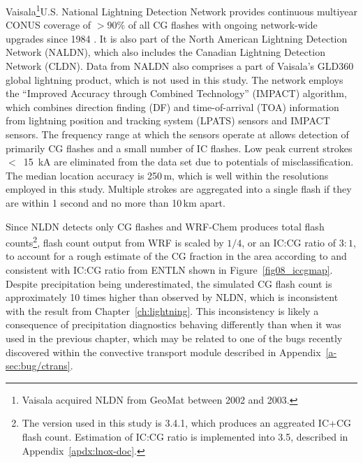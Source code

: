 
Vaisala\footnote{Vaisala acquired NLDN from GeoMat between 2002 and 2003.}U.S. National Lightning Detection Network
\citep[NLDN;][]{Cummins:2009aa} provides continuous multiyear CONUS coverage of $>90\%$ of all CG flashes with ongoing
network-wide upgrades since 1984 \citep{Orville:2002uq,Orville:2010uq}. It is also part of the North American Lightning
Detection Network (NALDN), which also includes the Canadian Lightning Detection Network (CLDN). Data from NALDN
also comprises a part of Vaisala's GLD360 global lightning product, which is not used in this study. The network employs
the ``Improved Accuracy through Combined Technology'' (IMPACT) algorithm, which combines direction finding (DF)
and time-of-arrival (TOA) information from lightning position and tracking system (LPATS) sensors and IMPACT sensors.
The frequency range at which the sensors operate at allows detection of primarily CG flashes and a small number of IC
flashes. Low peak current strokes $<$~15~\unit{kA} are eliminated from the data set due to potentials of misclassification. The
median location accuracy is 250\,\unit{m}, which is well within the resolutions employed in this study. Multiple strokes are
aggregated into a single flash if they are within 1 second and no more than 10\,\unit{km} apart.

Since NLDN detects only CG flashes and WRF-Chem produces total flash counts\footnote{The version used in this study is 3.4.1,
which produces an aggreated IC+CG flash count. Estimation of IC:CG ratio is implemented into 3.5, described in
Appendix~\ref{apdx:lnox-doc}.}, flash count output from WRF is scaled by $1/4$, or an IC:CG ratio of $3:1$, to account
for a rough estimate of the CG fraction in the area according to \citet{Boccippio:2001ys} and consistent with IC:CG ratio from ENTLN
shown in Figure~\ref{fig08_iccgmap}. Despite precipitation being underestimated, the simulated CG flash count is approximately
10 times higher than observed by NLDN, which is inconsistent with the result from Chapter~\ref{ch:lightning}. This
inconsistency is likely a consequence of precipitation diagnostics behaving differently than when it was used in the
previous chapter, which may be related to one of the bugs recently discovered within the convective transport module
described in Appendix~\ref{a-sec:bug/ctrans}.

